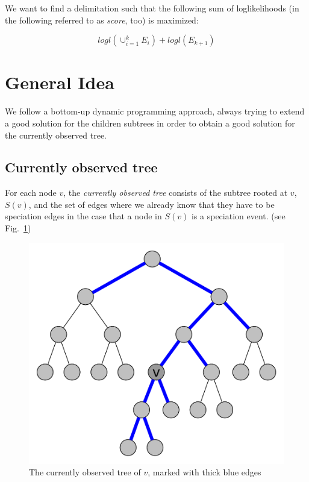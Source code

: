 \documentclass{llncs}
\begin{document}
We want to find a delimitation such that the following sum of loglikelihoods (in the following referred to as \emph{score}, too) is maximized:

$$logl(\cup_{i=1}^k{E_i}) + logl(E_{k+1})$$

\section{General Idea}

We follow a bottom-up dynamic programming approach, always trying to extend a good solution for the children subtrees in order to obtain a good solution for the currently observed tree.

\subsection{Currently observed tree}

For each node $v$, the \emph{currently observed tree} consists of the subtree rooted at $v$, $S(v)$, and the set of edges where we already know that they have to be speciation edges in the case that a node in $S(v)$ is a speciation event. (see Fig.~\ref{fig:currently_observed_tree})

\begin{figure}[h!]
	\centering
	\includegraphics[scale=0.4]{images/currently_observed_tree.pdf}
	\caption{The currently observed tree of $v$, marked with thick blue edges}
	\label{fig:currently_observed_tree}
\end{figure}
\end{document}
